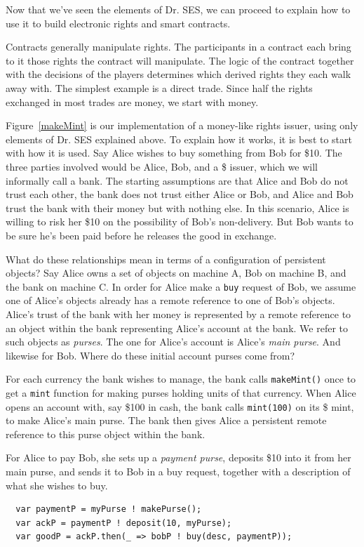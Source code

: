 \documentclass{llncs}
\begin{document}
Now that we've seen the elements of Dr. SES, we can proceed to explain how to use it to build electronic rights and smart contracts.

Contracts generally manipulate rights. The participants in a contract each bring to it those rights the contract will manipulate. The logic of the contract together with the decisions of the players determines which derived rights they each walk away with. The simplest example is a direct trade. Since half the rights exchanged in most trades are money, we start with money. 

Figure~\ref{makeMint}  is our implementation of a money-like rights issuer, using only elements of Dr. SES explained above. To explain how it works, it is best to start with how it is used. Say Alice wishes to buy something from Bob for \$10. The three parties involved would be Alice, Bob, and a \$ issuer, which we will informally call a bank. The starting assumptions are that Alice and Bob do not trust each other, the bank does not trust either Alice or Bob, and Alice and Bob trust the bank with their money but with nothing else. In this scenario, Alice is willing to risk her \$10 on the possibility of Bob's non-delivery. But Bob wants to be sure he's been paid before he releases the good in exchange.

What do these relationships mean in terms of a configuration of persistent objects? Say Alice owns a set of objects on machine A, Bob on machine B, and the bank on machine C. In order for Alice make a {\tt buy} request of Bob, we assume one of Alice's objects already has a remote reference to one of Bob's objects. Alice's trust of the bank with her money is represented by a remote reference to an object within the bank representing Alice's account at the bank. We refer to such objects as \emph{purses}. The one for Alice's account is Alice's \emph{main purse}. And likewise for Bob. Where do these initial account purses come from?

For each currency the bank wishes to manage, the bank calls {\tt makeMint()} once to get a {\tt mint} function for making purses holding units of that currency. When Alice opens an account with, say \$100 in cash, the bank calls {\tt mint(100)} on its \$ mint, to make Alice's main purse. The bank then gives Alice a persistent remote reference to this purse object within the bank.

For Alice to pay Bob, she sets up a \emph{payment purse}, deposits \$10 into it from her main purse, and sends it to Bob in a buy request, together with a description of what she wishes to buy.
\begin{verbatim}
  var paymentP = myPurse ! makePurse();
  var ackP = paymentP ! deposit(10, myPurse);
  var goodP = ackP.then(_ => bobP ! buy(desc, paymentP));
\end{verbatim}
\end{document}
